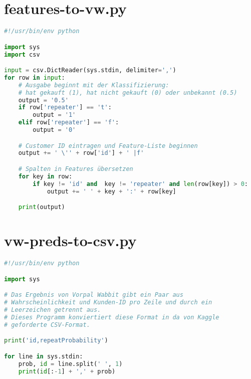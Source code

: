 \section{features-to-vw.py}
\label{code:features-to-vw}
\begin{lstlisting}[language=Python]
#!/usr/bin/env python

import sys
import csv

input = csv.DictReader(sys.stdin, delimiter=',')
for row in input:
	# Ausgabe beginnt mit der Klassifizierung:
	# hat gekauft (1), hat nicht gekauft (0) oder unbekannt (0.5)
	output = '0.5'
	if row['repeater'] == 't':
		output = '1'
	elif row['repeater'] == 'f':
		output = '0'

	# Customer ID eintragen und Feature-Liste beginnen
	output += ' \'' + row['id'] + ' |f'

	# Spalten in Features übersetzen
	for key in row:
		if key != 'id' and  key != 'repeater' and len(row[key]) > 0:
			output += ' ' + key + ':' + row[key]

	print(output)
\end{lstlisting}

\section{vw-preds-to-csv.py}
\label{code:vw-preds-to-csv}
\begin{lstlisting}[language=Python]
#!/usr/bin/env python

import sys

# Das Ergebnis von Vorpal Wabbit gibt ein Paar aus 
# Wahrscheinlichkeit und Kunden-ID pro Zeile und durch ein
# Leerzeichen getrennt aus.
# Dieses Programm konviertiert diese Format in da von Kaggle
# geforderte CSV-Format.

print('id,repeatProbability')

for line in sys.stdin:
	prob, id = line.split(' ', 1)
	print(id[:-1] + ',' + prob)
\end{lstlisting}
	
	